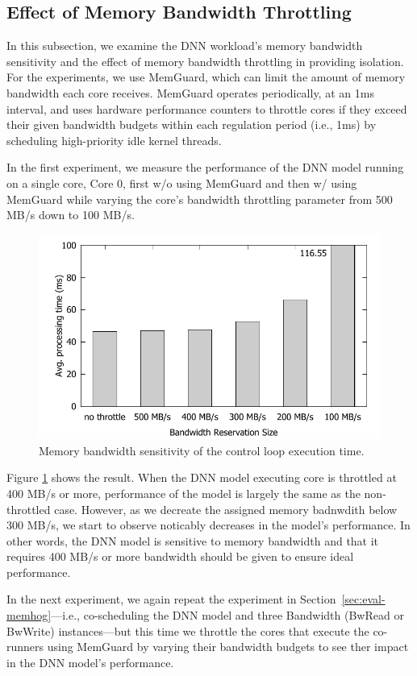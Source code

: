 \subsection{Effect of Memory Bandwidth Throttling}

In this subsection, we examine the DNN workload's memory bandwidth
sensitivity and the effect of memory bandwidth throttling in providing
isolation. For the experiments, we use MemGuard\cite{Yun2013}, which 
can limit the amount of memory bandwidth each core receives. MemGuard
operates periodically, at an 1ms interval, and uses hardware
performance counters to throttle cores if they exceed their given
bandwidth budgets within each regulation period (i.e., 1ms) by
scheduling high-priority idle kernel threads.

In the first experiment, we measure the performance of the DNN model
running on a single core, Core 0, first w/o using MemGuard and then w/
using MemGuard while varying the core's bandwidth throttling parameter
from 500 MB/s down to 100 MB/s.

\begin{figure}[h]
  \centering
  \includegraphics[width=.45\textwidth]{figs/memguard_multicore}
  \caption{ Memory bandwidth sensitivity of the control loop 
execution time. }
  \label{fig:memguard_multicore}
\end{figure}

Figure \ref{fig:memguard_multicore} shows the result. When the DNN
model executing core is throttled at 400 MB/s or more, performance of
the model is largely the same as the non-throttled case. However, as
we decreate the assigned memory badnwdith below 300 MB/s, we start to
observe noticably decreases in the model's performance. In other
words, the DNN model is sensitive to memory bandwidth and that it
requires 400 MB/s or more bandwidth should be given to ensure ideal
performance.

In the next experiment, we again repeat the experiment in
Section~\ref{sec:eval-memhog}---i.e., co-scheduling the DNN model and
three Bandwidth (BwRead or BwWrite) instances---but this time we
throttle the cores that execute the co-runners using MemGuard by 
varying their bandwidth budgets to see ther impact in the DNN model's
performance. 

